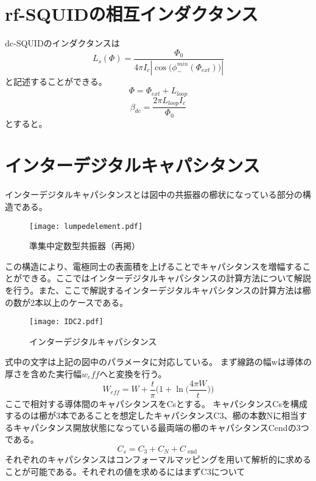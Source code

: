 \section{rf-SQUIDの相互インダクタンス}
dc-SQUIDのインダクタンスは
\begin{equation}
    L_{s}(\Phi)=\frac{\Phi_0}{4\pi I_{c}|{\cos({\phi_{-}^{min}(\Phi_{ext})}})|}
\end{equation}
と記述することができる。
\begin{equation}
    \Phi=\Phi_{ext}+L_{loop}
\end{equation}
\begin{equation}
    \beta_{dc}=\frac{2\pi L_{loop} I_{c}}{\Phi_{0}}
\end{equation}
とすると。
\section{インターデジタルキャパシタンス}
インターデジタルキャパシタンスとは図中の共振器の櫛状になっている部分の構造である。
\begin{figure}[H]
    \label{le}
    \centering
    \texttt{[image: lumpedelement.pdf]}
    \caption{準集中定数型共振器（再掲）}
\end{figure}
この構造により、電極同士の表面積を上げることでキャパシタンスを増幅することができる。ここではインターデジタルキャパシタンスの計算方法について解説を行う。また、ここで解説するインターデジタルキャパシタンスの計算方法は櫛の数が2本以上のケースである。\cite*{Gevorgian1996,Dib2005,Dib2001ComprehensiveSO}
\begin{figure}[H]
    \centering
    \texttt{[image: IDC2.pdf]}
    \caption{インターデジタルキャパシタンス}
\end{figure}
式中の文字は上記の図中のパラメータに対応している。
まず線路の幅wは導体の厚さを含めた実行幅$w_eff$へと変換を行う。\cite*{Gevorgian1996}
\begin{equation}
    W_{e f f}=W+\frac{t}{\pi}\biggl(1+\ln \biggl(\frac{4 \pi W}{t}\biggr)\biggr)
\end{equation}
ここで相対する導体間のキャパシタンスをCsとする。
キャパシタンスCsを構成するのは櫛が3本であることを想定したキャパシタンスC3、櫛の本数Nに相当するキャパシタンス開放状態になっている最両端の櫛のキャパシタンスCendの3つである。
\begin{equation}
    C_{s}=C_{3}+C_{N}+C_{\text { end }}
\end{equation}
それぞれのキャパシタンスはコンフォーマルマッピングを用いて解析的に求めることが可能である。それぞれの値を求めるにはまずC3について
